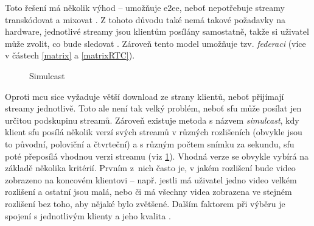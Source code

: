 Toto řešení má několik výhod -- umožňuje \gls{e2ee}, neboť nepotřebuje streamy
transkódovat a mixovat \parencite{WebRTCHacks-TrueE2EE}. Z tohoto důvodu také
nemá takové požadavky na hardware, jednotlivé streamy jsou klientům posílány
samostatně, takže si uživatel může zvolit, co bude sledovat
\parencite{Red5Pro-WebRTCScalingApproaches}. Zároveň tento model umožňuje tzv.
\textit{federaci} (více v částech \ref{matrix} a \ref{matrixRTC}).

\begin{figure}[H]
    \centering
    \caption{Simulcast}
    \label{simulcast}
\end{figure}

Oproti \gls{mcu} sice vyžaduje větší download ze strany klientů, neboť přijímají
streamy jednotlivě. Toto ale není tak velký problém, neboť \gls{sfu} může
posílat jen určitou podskupinu streamů. Zároveň existuje metoda s názvem
\textit{simulcast}, kdy klient \gls{sfu} posílá několik verzí svých streamů v
různých rozlišeních (obvykle jsou to původní, poloviční a čtvrteční) a s různým
počtem snímku za sekundu, \gls{sfu} poté přeposílá vhodnou verzi streamu (viz
\ref{simulcast}). Vhodná verze se obvykle vybírá na základě několika kritérií.
Prvním z~nich často je, v jakém rozlišení bude video zobrazeno na koncovém
klientovi -- např. jestli má uživatel jedno video velkém rozlišení a ostatní
jsou malá, nebo či má všechny videa zobrazena ve stejném rozlišení bez toho, aby
nějaké bylo zvětšené. Dalším faktorem při výběru je spojení s jednotlivým
klienty a jeho kvalita \parencite{LiveKit-SimulcastIntroduction}.
